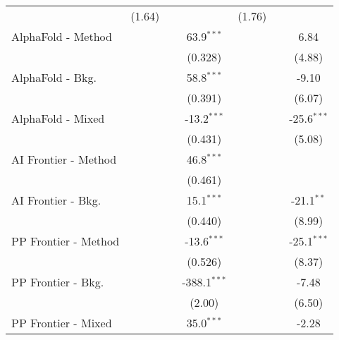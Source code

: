 \begin{tabular}{lcccccc}
                                & (1.64)        &               &                & (1.76)        &               &   \\   
   AlphaFold - Method           &               &               & 63.9$^{***}$   &               &               & 6.84\\   
                                &               &               & (0.328)        &               &               & (4.88)\\   
   AlphaFold - Bkg.             &               &               & 58.8$^{***}$   &               &               & -9.10\\   
                                &               &               & (0.391)        &               &               & (6.07)\\   
   AlphaFold - Mixed            &               &               & -13.2$^{***}$  &               &               & -25.6$^{***}$\\   
                                &               &               & (0.431)        &               &               & (5.08)\\   
   AI Frontier - Method         &               &               & 46.8$^{***}$   &               &               &   \\   
                                &               &               & (0.461)        &               &               &   \\   
   AI Frontier - Bkg.           &               &               & 15.1$^{***}$   &               &               & -21.1$^{**}$\\   
                                &               &               & (0.440)        &               &               & (8.99)\\   
   PP Frontier - Method         &               &               & -13.6$^{***}$  &               &               & -25.1$^{***}$\\   
                                &               &               & (0.526)        &               &               & (8.37)\\   
   PP Frontier - Bkg.           &               &               & -388.1$^{***}$ &               &               & -7.48\\   
                                &               &               & (2.00)         &               &               & (6.50)\\   
   PP Frontier - Mixed          &               &               & 35.0$^{***}$   &               &               & -2.28\\   

\end{tabular}
